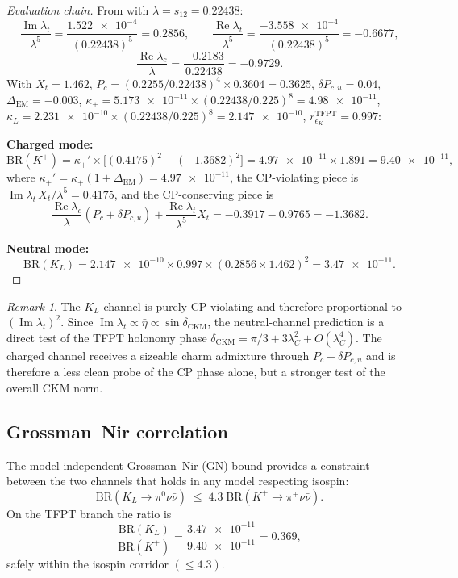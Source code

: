 \documentclass[11pt,a4paper]{article}
\theoremstyle{definition}
\theoremstyle{remark}
\newtheorem*{remark}{Remark}
\DeclareMathOperator{\im}{Im}
\DeclareMathOperator{\re}{Re}
\newcommand{\BR}{\mathrm{BR}}
\numberwithin{equation}{section}
\begin{document}
\begin{proof}[Evaluation chain]
From  with
$\lambda=s_{12}=\num{0.22438}$:
\[
\frac{\im\lambda_t}{\lambda^5}
=
\frac{\num{1.522e-4}}{(0.22438)^5}
=
\num{0.2856},
\qquad
\frac{\re\lambda_t}{\lambda^5}
=
\frac{-\num{3.558e-4}}{(0.22438)^5}
=
\num{-0.6677},
\]
\[
\frac{\re\lambda_c}{\lambda}
=
\frac{-\num{0.2183}}{0.22438}
=
\num{-0.9729}.
\]
With $X_t=1.462$, $P_c=(0.2255/0.22438)^4\times 0.3604=\num{0.3625}$,
$\delta P_{c,u}=0.04$, $\Delta_{\mathrm{EM}}=-0.003$,
$\kappa_+=\num{5.173e-11}\times(0.22438/0.225)^8=\num{4.98e-11}$,
$\kappa_L=\num{2.231e-10}\times(0.22438/0.225)^8=\num{2.147e-10}$,
$r_{\epsilon_K}^{\mathrm{TFPT}}=0.997$:

\medskip
\noindent\textbf{Charged mode:}
\[
\BR(K^+)
=
\kappa_+'\times\bigl[
(\num{0.4175})^2
+
(\num{-1.3682})^2
\bigr]
=
\num{4.97e-11}\times\num{1.891}
=
\num{9.40e-11},
\]
where $\kappa_+'=\kappa_+(1+\Delta_{\mathrm{EM}})=\num{4.97e-11}$,
the CP-violating piece is $\im\lambda_t\,X_t/\lambda^5=\num{0.4175}$,
and the CP-conserving piece is
\[
\frac{\re\lambda_c}{\lambda}(P_c+\delta P_{c,u})
+\frac{\re\lambda_t}{\lambda^5}X_t
=
\num{-0.3917}-\num{0.9765}
=
\num{-1.3682}.
\]

\noindent\textbf{Neutral mode:}
\[
\BR(K_L)
=
\num{2.147e-10}\times 0.997
\times(0.2856\times 1.462)^2
=
\num{3.47e-11}.
\]
\end{proof}

\begin{remark}
The $K_L$ channel is purely CP violating and therefore proportional to
$(\im\lambda_t)^2$.
Since $\im\lambda_t\propto\bar\eta\propto\sin\delta_{\mathrm{CKM}}$,
the neutral-channel prediction is a direct test of the TFPT holonomy
phase $\delta_{\mathrm{CKM}}=\pi/3+3\lambda_C^2+O(\lambda_C^4)$.
The charged channel receives a sizeable charm admixture through
$P_c+\delta P_{c,u}$ and is therefore a less clean probe of the
CP phase alone, but a stronger test of the overall CKM norm.
\end{remark}


\subsection{Grossman--Nir correlation}

The model-independent Grossman--Nir (GN) bound provides a
constraint between the two channels that holds in any model
respecting isospin:
\begin{equation}
\label{eq:gn-bound}
\BR(K_L\to\pi^0\nu\bar\nu)
\;\le\;
4.3\;\BR(K^+\!\to\pi^+\nu\bar\nu).
\end{equation}
On the TFPT branch the ratio is
\begin{equation}
\label{eq:gn-ratio}
\frac{\BR(K_L)}{\BR(K^+)}
=
\frac{\num{3.47e-11}}{\num{9.40e-11}}
=
0.369,
\end{equation}
safely within the isospin corridor $(\le 4.3)$.
\end{document}
